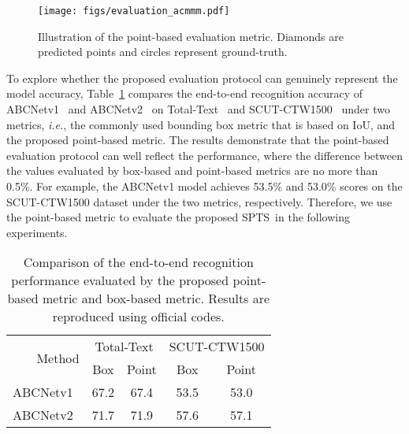 \documentclass[sigconf]{acmart}
\newcommand{\methodName}{SPTS}
\begin{document}
\begin{figure}[t!]
    \centering
    \texttt{[image: figs/evaluation\_acmmm.pdf]}
    \caption{Illustration of the point-based evaluation metric. Diamonds are predicted points and circles represent ground-truth.}
    \label{fig:eval}
\end{figure}
    
To explore whether the proposed evaluation protocol can genuinely represent the model accuracy, Table~\ref{tab:ab_metric} compares the end-to-end recognition accuracy of ABCNetv1~\cite{liu2020abcnet} and ABCNetv2~\cite{liu2021abcnetv2} on Total-Text~\cite{ch2017total} and SCUT-CTW1500~\cite{liu2019curved} under two metrics, \emph{i.e.}, the commonly used bounding box metric that is based on IoU, and the proposed point-based metric. The results demonstrate that the point-based evaluation protocol can well reflect the performance, where the difference between the values evaluated by box-based and point-based metrics are 
no more than 0.5\%. For example, the ABCNetv1 model achieves 53.5\% and 53.0\% scores on the SCUT-CTW1500 dataset under the two metrics, respectively. Therefore, we use the point-based metric to evaluate the proposed \methodName\ in the following experiments.
    
\begin{table}[t!]
    \centering
    \caption{Comparison of the end-to-end recognition performance evaluated by the proposed point-based metric and box-based metric. Results are reproduced using official codes.}
    \label{tab:ab_metric}
    \footnotesize
    \begin{tabular}{r|cc|cc}\hline
\multirow{2}{*}{Method} & \multicolumn{2}{c|}{Total-Text} & \multicolumn{2}{c}{SCUT-CTW1500} \\ \cline{2-5}
         & \multicolumn{1}{c|}{Box} & Point & \multicolumn{1}{c|}{Box} & \multicolumn{1}{c}{Point} \\ \hline
ABCNetv1~\cite{liu2020abcnet} & 67.2 & 67.4 & 53.5 & 53.0  \\
ABCNetv2~\cite{liu2021abcnetv2} & 71.7 & 71.9 & 57.6 & 57.1 \\ \hline
    \end{tabular}
\end{table}
\end{document}
